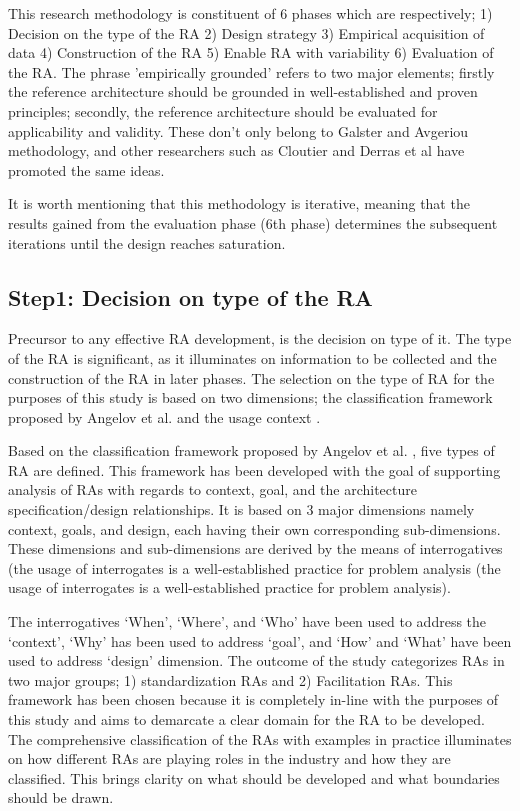 \documentclass[review]{elsarticle}
\begin{document}
This research methodology is constituent of 6 phases which are respectively; 1) Decision on the type of the RA 2) Design strategy 3) Empirical acquisition of data 4) Construction of the RA 5) Enable RA with variability 6) Evaluation of the RA. The phrase 'empirically grounded' refers to two major elements; firstly the reference architecture should be grounded in well-established and proven principles; secondly, the reference architecture should be evaluated for applicability and validity. These don't only belong to Galster and Avgeriou methodology, and other researchers such as Cloutier \cite{Cloutier} and Derras et al \cite{Derras} have promoted the same ideas. 

It is worth mentioning that this methodology is iterative, meaning that the results gained from the evaluation phase (6th phase) determines the subsequent iterations until the design reaches saturation.

\subsection{Step1: Decision on type of the RA}

Precursor to any effective RA development, is the decision on type of it. The type of the RA is significant, as it illuminates on information to be collected and the construction of the RA in later phases. The selection on the type of RA for the purposes of this study is based on two dimensions; the classification framework proposed by Angelov et al. \cite{angelov2009classification} and the usage context \cite{angelov2008contracting}. 

Based on the classification framework proposed by Angelov et al. \cite{angelov2009classification}, five types of RA are defined. This framework has been developed with the goal of supporting analysis of RAs with regards to context, goal, and the architecture specification/design relationships. It is based on 3 major dimensions namely context, goals, and design, each having their own corresponding sub-dimensions. These dimensions and sub-dimensions are derived by the means of interrogatives (the usage of interrogates is a well-established practice for problem analysis (the usage of interrogates is a well-established practice for problem analysis). 

The interrogatives ‘When’, ‘Where’, and ‘Who’ have been used to address the ‘context’, ‘Why’ has been used to address ‘goal’, and ‘How’ and ‘What’ have been used to address ‘design’ dimension. The outcome of the study categorizes RAs in two major groups; 1) standardization RAs and 2) Facilitation RAs. This framework has been chosen because it is completely in-line with the purposes of this study and aims to demarcate a clear domain for the RA to be developed. The comprehensive classification of the RAs with examples in practice illuminates on how different RAs are playing roles in the industry and how they are classified. This brings clarity on what should be developed and what boundaries should be drawn.  
\end{document}
